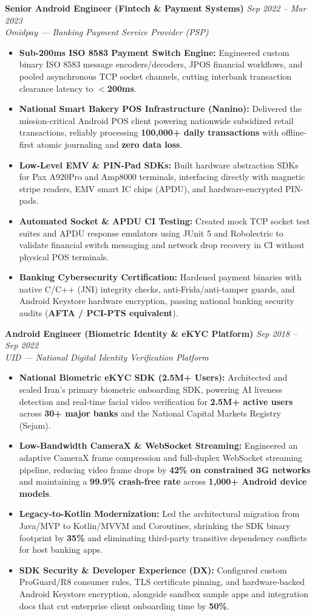\documentclass[letterpaper,10pt]{article}
\newcommand{\resumeItem}[1]{
  \item\small{#1}
}
\newcommand{\jobEntry}[4]{
  \textbf{#1} \hfill \textit{\small\color{lightgray}#3 -- #4} \\
  \textit{\small\color{lightgray}#2}
}
\begin{document}
\vspace{3pt}
\jobEntry{Senior Android Engineer (Fintech \& Payment Systems)}{Omidpay — Banking Payment Service Provider (PSP)}{Sep 2022}{Mar 2023}
\begin{itemize}
  \resumeItem{\textbf{Sub-200ms ISO 8583 Payment Switch Engine:} Engineered custom binary ISO 8583 message encoders/decoders, JPOS financial workflows, and pooled asynchronous TCP socket channels, cutting interbank transaction clearance latency to \textbf{$<$200ms}.}
  \resumeItem{\textbf{National Smart Bakery POS Infrastructure (Nanino):} Delivered the mission-critical Android POS client powering nationwide subsidized retail transactions, reliably processing \textbf{100,000+ daily transactions} with offline-first atomic journaling and \textbf{zero data loss}.}
  \resumeItem{\textbf{Low-Level EMV \& PIN-Pad SDKs:} Built hardware abstraction SDKs for Pax A920Pro and Amp8000 terminals, interfacing directly with magnetic stripe readers, EMV smart IC chips (APDU), and hardware-encrypted PIN-pads.}
  \resumeItem{\textbf{Automated Socket \& APDU CI Testing:} Created mock TCP socket test suites and APDU response emulators using JUnit 5 and Robolectric to validate financial switch messaging and network drop recovery in CI without physical POS terminals.}
  \resumeItem{\textbf{Banking Cybersecurity Certification:} Hardened payment binaries with native C/C++ (JNI) integrity checks, anti-Frida/anti-tamper guards, and Android Keystore hardware encryption, passing national banking security audits (\textbf{AFTA / PCI-PTS equivalent}).}
\end{itemize}

\vspace{3pt}
\jobEntry{Android Engineer (Biometric Identity \& eKYC Platform)}{UID — National Digital Identity Verification Platform}{Sep 2018}{Sep 2022}
\begin{itemize}
  \resumeItem{\textbf{National Biometric eKYC SDK (2.5M+ Users):} Architected and scaled Iran's primary biometric onboarding SDK, powering AI liveness detection and real-time facial video verification for \textbf{2.5M+ active users} across \textbf{30+ major banks} and the National Capital Markets Registry (Sejam).}
  \resumeItem{\textbf{Low-Bandwidth CameraX \& WebSocket Streaming:} Engineered an adaptive CameraX frame compression and full-duplex WebSocket streaming pipeline, reducing video frame drops by \textbf{42\% on constrained 3G networks} and maintaining a \textbf{99.9\% crash-free rate} across \textbf{1,000+ Android device models}.}
  \resumeItem{\textbf{Legacy-to-Kotlin Modernization:} Led the architectural migration from Java/MVP to Kotlin/MVVM and Coroutines, shrinking the SDK binary footprint by \textbf{35\%} and eliminating third-party transitive dependency conflicts for host banking apps.}
  \resumeItem{\textbf{SDK Security \& Developer Experience (DX):} Configured custom ProGuard/R8 consumer rules, TLS certificate pinning, and hardware-backed Android Keystore encryption, alongside sandbox sample apps and integration docs that cut enterprise client onboarding time by \textbf{50\%}.}
\end{itemize}
\end{document}
